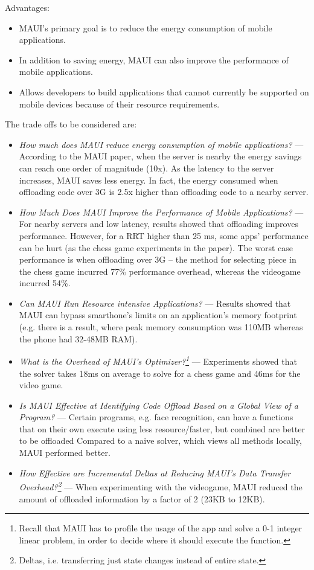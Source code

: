 \documentclass[12pt]{article}
\begin{document}
Advantages:
\begin{itemize}
    \item MAUI's primary goal is to reduce the energy consumption of mobile
        applications. 
    \item In addition to saving energy, MAUI can also
        improve the performance of mobile applications.
    \item Allows
        developers to build applications that cannot currently be supported on
        mobile devices because of their resource requirements.
\end{itemize}
  
The trade offs to be considered are:
\begin{itemize}
    \item \emph{How much does MAUI reduce energy consumption of mobile
        applications?} --- According to the MAUI paper, when the server is nearby
        the energy savings can reach one order of magnitude (10x). As the
        latency to the server increases, MAUI saves less energy. In fact, the
        energy consumed when offloading code over 3G is 2.5x higher than
        offloading code to a nearby server.
    \item \emph{How Much Does MAUI Improve the Performance of Mobile
        Applications?} --- For nearby servers and low latency, results showed
        that offloading improves performance. However, for a RRT higher than 25
        ms, some apps' performance can be hurt (as the chess game experiments in
        the paper). The worst case performance is when offloading over 3G -- the
        method for selecting piece in the chess game incurred 77\% performance overhead,
        whereas the videogame incurred 54\%.
    \item \emph{Can  MAUI  Run  Resource intensive Applications?} --- Results showed
        that MAUI can bypass smarthone's limits on an application's memory footprint
        (e.g. there is a result, where peak memory consumption was 110MB whereas the
        phone had 32-48MB RAM).
    \item \emph{What is the Overhead of MAUI's Optimizer?\footnote{Recall that
        MAUI has to profile the usage of the app and solve a 0-1 integer linear
        problem, in order to decide where it should execute the function.}} ---
        Experiments showed that the solver takes 18ms on average to solve for a
        chess game and 46ms for the video game.
    \item \emph{Is MAUI Effective at Identifying Code Offload Based on a Global
        View of a Program?} --- Certain programs, e.g. face recognition, can
        have a functions that on their own execute using less resource/faster,
        but combined are better to be offloaded Compared to a naive solver,
        which views all methods locally, MAUI performed better.
    \item \emph{How Effective are Incremental Deltas at Reducing MAUI's Data
        Transfer Overhead?\footnote{Deltas, i.e. transferring just state
        changes instead of entire state.}} --- When experimenting with
        the videogame, MAUI reduced the amount of offloaded information
        by a factor of 2 (23KB to 12KB).
\end{itemize}
\end{document}
